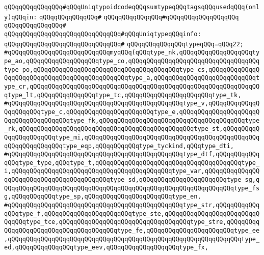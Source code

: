 \newline
\newline
\verb|qQQqqQQqqQQqqQQq#qQQqUniqtypoidcodeqQQqsumtypeqQQqtagsqQQqusedqQQq(only)qQQqin:|\newline
\verb|qQQqqQQqqQQqqQQq#|\newline
\verb|qQQqqQQqqQQqqQQq#qQQqqQQqqQQqqQQqqQQq|\newline
\verb|qQQqqQQqqQQqqQQq#|\newline
\verb|qQQqqQQqqQQqqQQqqQQqqQQqqQQqqQQq#qQQqUniqtypeqQQqinfo:|\newline
\verb|qQQqqQQqqQQqqQQqqQQqqQQqqQQqqQQq#|\newline
\verb|qQQqqQQqqQQqqQQqtypeqQQq=qQQq22;|\newline
\verb|#qQQqqQQqqQQqqQQqqQQqqQQqqQQqmyqQQq(qQQqtype_nk,qQQqqQQqqQQqqQQqqQQqtype_ao,qQQqqQQqqQQqqQQqqQQqtype_co,qQQqqQQqqQQqqQQqqQQqqQQqqQQqqQQqqQQqtype_po,qQQqqQQqqQQqqQQqqQQqqQQqqQQqqQQqqQQqqQQqtype_cs,qQQqqQQqqQQqqQQqqQQqqQQqqQQqqQQqqQQqqQQqqQQqqQQqtype_a,qQQqqQQqqQQqqQQqqQQqqQQqqQQqtype_cr,qQQqqQQqqQQqqQQqqQQqqQQqqQQqqQQqqQQqqQQqqQQqqQQqqQQqqQQqqQQqqQQqtype_lt,qQQqqQQqqQQqqQQqtype_tc,qQQqqQQqqQQqqQQqqQQqqQQqtype_tk,|\newline
\verb|#qQQqqQQqqQQqqQQqqQQqqQQqqQQqqQQqqQQqqQQqqQQqqQQqtype_v,qQQqqQQqqQQqqQQqqQQqqQQqtype_c,qQQqqQQqqQQqqQQqqQQqqQQqtype_e,qQQqqQQqqQQqqQQqqQQqqQQqqQQqqQQqqQQqqQQqtype_fk,qQQqqQQqqQQqqQQqqQQqqQQqqQQqqQQqqQQqqQQqtype_rk,qQQqqQQqqQQqqQQqqQQqqQQqqQQqqQQqqQQqqQQqqQQqqQQqtype_st,qQQqqQQqqQQqqQQqqQQqqQQqtype_mi,qQQqqQQqqQQqqQQqqQQqqQQqqQQqqQQqqQQqqQQqqQQqqQQqqQQqqQQqqQQqqQQqtype_eqp,qQQqqQQqqQQqtype_tyckind,qQQqtype_dti,|\newline
\verb|#qQQqqQQqqQQqqQQqqQQqqQQqqQQqqQQqqQQqqQQqqQQqqQQqtype_dtf,qQQqqQQqqQQqqQQqtype_type,qQQqtype_t,qQQqqQQqqQQqqQQqqQQqqQQqqQQqqQQqqQQqqQQqtype_i,qQQqqQQqqQQqqQQqqQQqqQQqqQQqqQQqqQQqqQQqqQQqtype_var,qQQqqQQqqQQqqQQqqQQqqQQqqQQqqQQqqQQqqQQqqQQqtype_sd,qQQqqQQqqQQqqQQqqQQqqQQqtype_sg,qQQqqQQqqQQqqQQqqQQqqQQqqQQqqQQqqQQqqQQqqQQqqQQqqQQqqQQqqQQqqQQqtype_fsg,qQQqqQQqqQQqtype_sp,qQQqqQQqqQQqqQQqqQQqqQQqtype_en,|\newline
\verb|#qQQqqQQqqQQqqQQqqQQqqQQqqQQqqQQqqQQqqQQqqQQqqQQqtype_str,qQQqqQQqqQQqqQQqtype_f,qQQqqQQqqQQqqQQqqQQqqQQqtype_ste,qQQqqQQqqQQqqQQqqQQqqQQqqQQqqQQqtype_tce,qQQqqQQqqQQqqQQqqQQqqQQqqQQqqQQqqQQqtype_stre,qQQqqQQqqQQqqQQqqQQqqQQqqQQqqQQqqQQqqQQqtype_fe,qQQqqQQqqQQqqQQqqQQqqQQqtype_ee,qQQqqQQqqQQqqQQqqQQqqQQqqQQqqQQqqQQqqQQqqQQqqQQqqQQqqQQqqQQqqQQqtype_ed,qQQqqQQqqQQqqQQqtype_eev,qQQqqQQqqQQqqQQqqQQqtype_fx,|\newline
